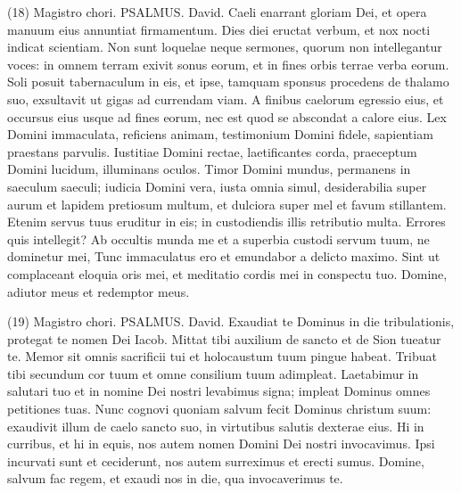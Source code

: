\begin{biblechapter}  (18) 
\verse  Magistro chori. PSALMUS. David. 
\verse Caeli enarrant gloriam Dei, et opera manuum eius annuntiat firmamentum. 
\verse Dies diei eructat verbum, et nox nocti indicat scientiam. 
\verse Non sunt loquelae neque sermones, quorum non intellegantur voces: 
\verse in omnem terram exivit sonus eorum, et in fines orbis terrae verba eorum. 
\verse Soli posuit tabernaculum in eis, et ipse, tamquam sponsus procedens de thalamo suo, exsultavit ut gigas ad currendam viam. 
\verse A finibus caelorum egressio eius, et occursus eius usque ad fines eorum, nec est quod se abscondat a calore eius. 
\verse Lex Domini immaculata, reficiens animam, testimonium Domini fidele, sapientiam praestans parvulis. 
\verse Iustitiae Domini rectae, laetificantes corda, praeceptum Domini lucidum, illuminans oculos. 
\verse Timor Domini mundus, permanens in saeculum saeculi; iudicia Domini vera, iusta omnia simul, 
\verse desiderabilia super aurum et lapidem pretiosum multum, et dulciora super mel et favum stillantem. 
\verse Etenim servus tuus eruditur in eis; in custodiendis illis retributio multa. 
\verse Errores quis intellegit? Ab occultis munda me 
\verse et a superbia custodi servum tuum, ne dominetur mei, Tunc immaculatus ero et emundabor a delicto maximo. 
\verse Sint ut complaceant eloquia oris mei, et meditatio cordis mei in conspectu tuo. Domine, adiutor meus et redemptor meus. 
\end{biblechapter}

\begin{biblechapter}  (19) 
\verse  Magistro chori. PSALMUS. David. 
\verse Exaudiat te Dominus in die tribulationis, protegat te nomen Dei Iacob. 
\verse Mittat tibi auxilium de sancto et de Sion tueatur te. 
\verse Memor sit omnis sacrificii tui et holocaustum tuum pingue habeat. 
\verse Tribuat tibi secundum cor tuum et omne consilium tuum adimpleat. 
\verse Laetabimur in salutari tuo et in nomine Dei nostri levabimus signa; impleat Dominus omnes petitiones tuas. 
\verse Nunc cognovi quoniam salvum fecit Dominus christum suum: exaudivit illum de caelo sancto suo, in virtutibus salutis dexterae eius. 
\verse Hi in curribus, et hi in equis, nos autem nomen Domini Dei nostri invocavimus. 
\verse Ipsi incurvati sunt et ceciderunt, nos autem surreximus et erecti sumus. 
\verse Domine, salvum fac regem, et exaudi nos in die, qua invocaverimus te. 
\end{biblechapter}

